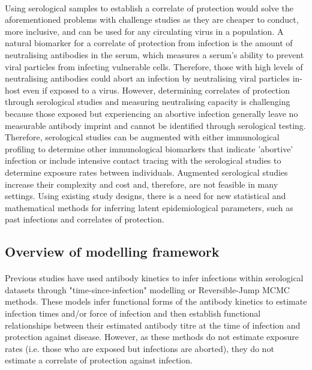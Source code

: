 \paragraph{}Using serological samples to establish a correlate of protection would solve the aforementioned problems with challenge studies as they are cheaper to conduct, more inclusive, and can be used for any circulating virus in a population. A natural biomarker for a correlate of protection from infection is the amount of neutralising antibodies in the serum, which measures a serum's ability to prevent viral particles from infecting vulnerable cells. Therefore, those with high levels of neutralising antibodies could abort an infection by neutralising viral particles in-host even if exposed to a virus. However, determining correlates of protection through serological studies and measuring neutralising capacity is challenging because those exposed but experiencing an abortive infection generally leave no measurable antibody imprint and cannot be identified through serological testing.\cite{Swadling2023-ud}  Therefore, serological studies can be augmented with either immunological profiling to determine other immunological biomarkers that indicate 'abortive' infection\cite{Swadling2022-yv} or include intensive contact tracing with the serological studies to determine exposure rates between individuals.\cite{Cohen2022-sy} Augmented serological studies increase their complexity and cost and, therefore, are not feasible in many settings. Using existing study designs, there is a need for new statistical and mathematical methods for inferring latent epidemiological parameters, such as past infections and correlates of protection.
  

\subsection{Overview of modelling framework}
\paragraph{}Previous studies have used antibody kinetics to infer infections within serological datasets through "time-since-infection" modelling or Reversible-Jump MCMC methods.\cite{Simonsen2009-yw, Salje2018-lb, Tsang2022-iy} These models infer functional forms of the antibody kinetics to estimate infection times and/or force of infection and then establish functional relationships between their estimated antibody titre at the time of infection and protection against disease. However, as these methods do not estimate exposure rates (i.e. those who are exposed but infections are aborted), they do not estimate a correlate of protection against infection.

